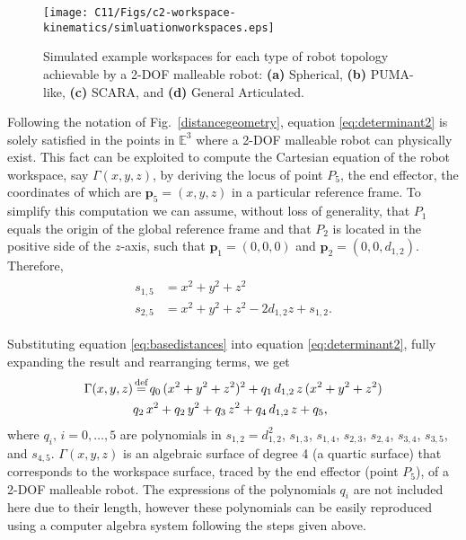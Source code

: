 \begin{figure*}[t!]
    \centering
    \texttt{[image: C11/Figs/c2-workspace-kinematics/simluationworkspaces.eps]}
    \caption{Simulated example workspaces for each type of robot topology achievable by a 2-DOF malleable robot: \textbf{(a)} Spherical, \textbf{(b)} PUMA-like, \textbf{(c)} SCARA, and \textbf{(d)} General Articulated. \cite{clark2020design}}
    \label{simulationworkspace}
\end{figure*}

Following the notation of Fig.~\ref{distancegeometry}, equation \eqref{eq:determinant2} is solely satisfied in the points in $\mathbb{E}^{3}$ where a 2-DOF malleable robot can physically exist. This fact can be exploited to compute the Cartesian equation of the robot workspace, say $\Gamma(x, y, z)$, by deriving the locus of point $P_5$, the end effector, the coordinates of which are $\mathbf{p}_5 = (x, y, z)$ in a particular reference frame. To simplify this computation we can assume, without loss of generality, that $P_1$ equals the origin of the global reference frame and that $P_2$ is located in the positive side of the $z$-axis, such that $\mathbf{p}_1 = (0, 0, 0)$ and $\mathbf{p}_2 = (0, 0, d_{1,2})$. Therefore,
\begin{align}
\begin{split}
    s_{1,5} &= x^2 + y^2 + z^2\\
    s_{2,5} &= x^2 + y^2 + z^2 - 2d_{1,2}z + s_{1,2}. \label{eq:basedistances}
\end{split}
\end{align}

Substituting equation \eqref{eq:basedistances} into equation \eqref{eq:determinant2}, fully expanding the result and rearranging terms, we get
\begin{align}
    \Gamma(x, y, z) & \myeq  q_0\,(x^2+y^2+z^2)^2+q_1\,d_{1,2}\,z\,(x^2+y^2+z^2) \nonumber \\
    & q_2\,x^2+q_2\,y^2+q_3\,z^2+q_4\,d_{1,2}\,z+q_5, \label{eq:Gamma}
\end{align}
where $q_i,\,i=0,\ldots,5$ are polynomials in $s_{1,2}=d_{1,2}^2$, $s_{1,3}$, $s_{1,4}$, $s_{2,3}$, $s_{2,4}$, $s_{3,4}$, $s_{3,5}$, and $s_{4,5}$. $\Gamma(x, y, z)$ is an algebraic surface of degree 4 (a quartic surface) that corresponds to the workspace surface, traced by the end effector (point $P_5$), of a 2-DOF malleable robot. The expressions of the polynomials $q_i$ are not included here due to their length, however these polynomials can be easily reproduced using a computer algebra system following the steps given above.

